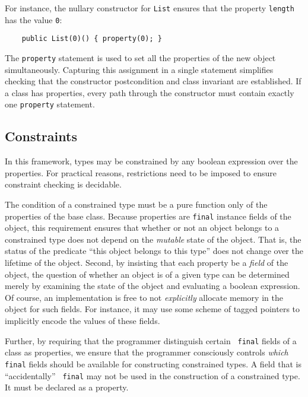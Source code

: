 For instance, the
nullary constructor for {\tt List} ensures that the property
{\tt length} has the value {\tt 0}:
{\footnotesize
\begin{verbatim}
    public List(0)() { property(0); }
\end{verbatim}}
The {\tt property} statement is used to set all the properties
of the new object simultaneously.  Capturing this assignment in
a single statement simplifies checking that the constructor
postcondition and class invariant are established.  If a class
has properties, every path through the constructor must contain
exactly one {\tt property} statement.



\subsection{Constraints}

In this framework, types may be constrained by any boolean
expression over the properties.  For practical reasons,
restrictions need to be imposed to ensure constraint checking is
decidable.

The condition of a constrained type must be a pure
function only of the properties of the base class.
Because properties are
{\tt final} instance fields of the object,
this requirement
ensures that whether or not an object belongs to a constrained type does
not depend on the {\em mutable} state of the object.
That is, the status of the
predicate ``this object belongs to this type'' does not
change over the lifetime of the object.  Second, by insisting that each
property be a {\em field} of the object, the question of
whether an object is of a given type can be
determined merely by examining the state of the object and evaluating
a boolean expression. Of course, an implementation is free to not {\em
explicitly} allocate memory in the object for such fields. For
instance, it may use some scheme of tagged pointers to implicitly
encode the values of these fields.

Further, by requiring that the programmer distinguish certain {\tt
final} fields of a class as properties, we ensure that the programmer
consciously controls {\em which} {\tt final} fields should be available for
constructing constrained types. A field that is ``accidentally'' {\tt
final} may not be used in the construction of a constrained type. It must be
declared as a property.


